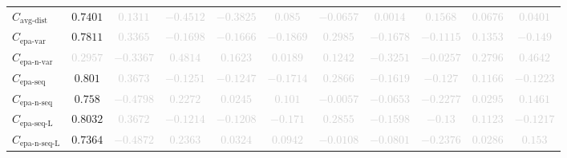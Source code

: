 \documentclass{standalone}
\newcommand{\avgdistname}{\text{avg-dist}}
\newcommand{\avgdist}{C_{\avgdistname}}
\newcommand{\epavariantname}{\text{epa-var}}
\newcommand{\epavariant}{C_{\epavariantname}}
\newcommand{\epanormvariantname}{\text{epa-n-var}}
\newcommand{\epanormvariant}{C_{\epanormvariantname}}
\newcommand{\epasequencename}{\text{epa-seq}}
\newcommand{\epasequence}{C_{\epasequencename}}
\newcommand{\epanormsequencename}{\text{epa-n-seq}}
\newcommand{\epanormsequence}{C_{\epanormsequencename}}
\newcommand{\epasequencelname}{\text{epa-seq-L}}
\newcommand{\epasequencel}{C_{\epasequencelname}}
\newcommand{\epanormsequencelname}{\text{epa-n-seq-L}}
\newcommand{\epanormsequencel}{C_{\epanormsequencelname}}
\begin{document}
\begin{tabular}{lcccccccccc}
$\avgdist$ & $0.7401$ & \textcolor{lightgray}{$0.1311$} & \textcolor{lightgray}{$-0.4512$} & \textcolor{lightgray}{$-0.3825$} & \textcolor{lightgray}{$0.085$} & \textcolor{lightgray}{$-0.0657$} & \textcolor{lightgray}{$0.0014$} & \textcolor{lightgray}{$0.1568$} & \textcolor{lightgray}{$0.0676$} & \textcolor{lightgray}{$0.0401$} \\ 
$\epavariant$ & $0.7811$ & \textcolor{lightgray}{$0.3365$} & \textcolor{lightgray}{$-0.1698$} & \textcolor{lightgray}{$-0.1666$} & \textcolor{lightgray}{$-0.1869$} & \textcolor{lightgray}{$0.2985$} & \textcolor{lightgray}{$-0.1678$} & \textcolor{lightgray}{$-0.1115$} & \textcolor{lightgray}{$0.1353$} & \textcolor{lightgray}{$-0.149$} \\ 
$\epanormvariant$ & \textcolor{lightgray}{$0.2957$} & \textcolor{lightgray}{$-0.3367$} & \textcolor{lightgray}{$0.4814$} & \textcolor{lightgray}{$0.1623$} & \textcolor{lightgray}{$0.0189$} & \textcolor{lightgray}{$0.1242$} & \textcolor{lightgray}{$-0.3251$} & \textcolor{lightgray}{$-0.0257$} & \textcolor{lightgray}{$0.2796$} & \textcolor{lightgray}{$0.4642$} \\ 
$\epasequence$ & $0.801$ & \textcolor{lightgray}{$0.3673$} & \textcolor{lightgray}{$-0.1251$} & \textcolor{lightgray}{$-0.1247$} & \textcolor{lightgray}{$-0.1714$} & \textcolor{lightgray}{$0.2866$} & \textcolor{lightgray}{$-0.1619$} & \textcolor{lightgray}{$-0.127$} & \textcolor{lightgray}{$0.1166$} & \textcolor{lightgray}{$-0.1223$} \\ 
$\epanormsequence$ & $0.758$ & \textcolor{lightgray}{$-0.4798$} & \textcolor{lightgray}{$0.2272$} & \textcolor{lightgray}{$0.0245$} & \textcolor{lightgray}{$0.101$} & \textcolor{lightgray}{$-0.0057$} & \textcolor{lightgray}{$-0.0653$} & \textcolor{lightgray}{$-0.2277$} & \textcolor{lightgray}{$0.0295$} & \textcolor{lightgray}{$0.1461$} \\ 
$\epasequencel$ & $0.8032$ & \textcolor{lightgray}{$0.3672$} & \textcolor{lightgray}{$-0.1214$} & \textcolor{lightgray}{$-0.1208$} & \textcolor{lightgray}{$-0.171$} & \textcolor{lightgray}{$0.2855$} & \textcolor{lightgray}{$-0.1598$} & \textcolor{lightgray}{$-0.13$} & \textcolor{lightgray}{$0.1123$} & \textcolor{lightgray}{$-0.1217$} \\ 
$\epanormsequencel$ & $0.7364$ & \textcolor{lightgray}{$-0.4872$} & \textcolor{lightgray}{$0.2363$} & \textcolor{lightgray}{$0.0324$} & \textcolor{lightgray}{$0.0942$} & \textcolor{lightgray}{$-0.0108$} & \textcolor{lightgray}{$-0.0801$} & \textcolor{lightgray}{$-0.2376$} & \textcolor{lightgray}{$0.0286$} & \textcolor{lightgray}{$0.153$} \\ 

\end{tabular}
\end{document}
